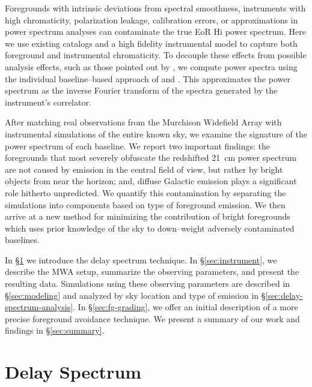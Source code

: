 \documentclass[preprint2,iop,numberedappendix]{emulateapj}
\begin{document}
Foregrounds with intrinsic deviations from spectral smoothness, instruments with high chromaticity, polarization leakage, calibration errors, or approximations in power spectrum analyses can contaminate the true EoR H{\sc i} power spectrum. Here we use existing catalogs and a high fidelity instrumental model to capture both foreground and instrumental chromaticity. To decouple these effects from possible analysis effects, such as those pointed out by \citet{haz13}, we compute power spectra using the individual baseline--based approach of \citet{pob13} and \citet{par14}. This approximates the power spectrum as the inverse Fourier transform of the spectra generated by the instrument's correlator. 

After matching real observations from the Murchison Widefield Array with instrumental simulations of the entire known sky, we examine the signature of the power spectrum of each baseline. We report two important findings: the foregrounds that most severely obfuscate the redshifted 21~cm power spectrum are not caused by emission in the central field of view, but rather by bright objects from near the horizon; and, diffuse Galactic emission plays a significant role hitherto unpredicted. %
We quantify this contamination by separating the simulations into components based on type of foreground emission. We then arrive at a new method for minimizing the contribution of bright foregrounds which uses prior knowledge of the sky to down--weight adversely contaminated baselines.

In \S\ref{sec:delay-spectrum} we introduce the delay spectrum technique. In \S\ref{sec:instrument}, we describe the MWA setup, summarize the observing parameters, and present the resulting data. Simulations using these observing parameters are described in \S\ref{sec:modeling} and analyzed by sky location and type of emission in \S\ref{sec:delay-spectrum-analysis}. In \S\ref{sec:fg-grading}, we offer an initial description of a more precise foreground avoidance technique. We present a summary of our work and findings in \S\ref{sec:summary}.

\section{Delay Spectrum}\label{sec:delay-spectrum}
\end{document}
